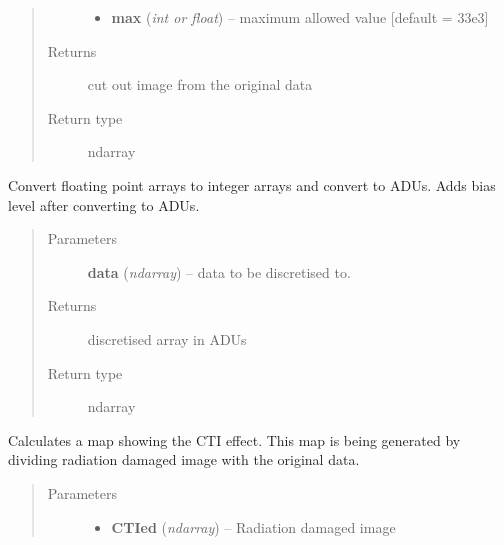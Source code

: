 \documentclass[a4paper,11pt,english]{sphinxmanual}
\begin{document}
\begin{fulllineitems}
\begin{fulllineitems}
\begin{quote}
\begin{description}
\begin{itemize}
\item {} 
\textbf{max} (\emph{int or float}) -- maximum allowed value {[}default = 33e3{]}

\end{itemize}

\item[{Returns}] \leavevmode
cut out image from the original data

\item[{Return type}] \leavevmode
ndarray

\end{description}\end{quote}

\end{fulllineitems}


\begin{fulllineitems}
\label{postproc:postproc.postprocessing.PostProcessing.discretisetoADUs}
Convert floating point arrays to integer arrays and convert to ADUs.
Adds bias level after converting to ADUs.
\begin{quote}\begin{description}
\item[{Parameters}] \leavevmode
\textbf{data} (\emph{ndarray}) -- data to be discretised to.

\item[{Returns}] \leavevmode
discretised array in ADUs

\item[{Return type}] \leavevmode
ndarray

\end{description}\end{quote}

\end{fulllineitems}


\begin{fulllineitems}
\label{postproc:postproc.postprocessing.PostProcessing.generateCTImap}
Calculates a map showing the CTI effect. This map is being
generated by dividing radiation damaged image with the original
data.
\begin{quote}\begin{description}
\item[{Parameters}] \leavevmode\begin{itemize}
\item {} 
\textbf{CTIed} (\emph{ndarray}) -- Radiation damaged image


\end{itemize}
\end{description}
\end{quote}
\end{fulllineitems}
\end{fulllineitems}
\end{document}
